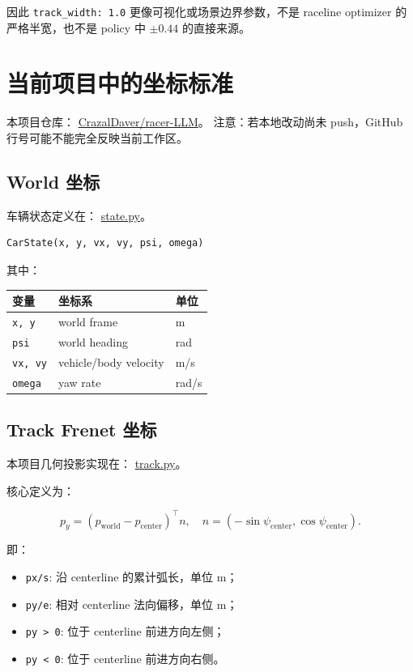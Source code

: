 \documentclass[UTF8]{ctexart}
\begin{document}
因此 \texttt{track\_width: 1.0} 更像可视化或场景边界参数，不是 raceline optimizer 的严格半宽，也不是 policy 中 \texttt{\(\pm 0.44\)} 的直接来源。

\section{当前项目中的坐标标准}

本项目仓库：
\href{https://github.com/CrazalDaver/racer-LLM}{CrazalDaver/racer-LLM}。
注意：若本地改动尚未 push，GitHub 行号可能不能完全反映当前工作区。

\subsection{World 坐标}

车辆状态定义在：
\href{https://github.com/CrazalDaver/racer-LLM/blob/main/state.py}{state.py}。

\begin{lstlisting}[language=Python]
CarState(x, y, vx, vy, psi, omega)
\end{lstlisting}

其中：

\begin{center}
\begin{tabular}{lll}
\toprule
变量 & 坐标系 & 单位 \\
\midrule
\texttt{x, y} & world frame & m \\
\texttt{psi} & world heading & rad \\
\texttt{vx, vy} & vehicle/body velocity & m/s \\
\texttt{omega} & yaw rate & rad/s \\
\bottomrule
\end{tabular}
\end{center}

\subsection{Track Frenet 坐标}

本项目几何投影实现在：
\href{https://github.com/CrazalDaver/racer-LLM/blob/main/track.py}{track.py}。

核心定义为：

\[
p_y = (p_{\mathrm{world}} - p_{\mathrm{center}})^\top n,
\quad
n = (-\sin\psi_{\mathrm{center}}, \cos\psi_{\mathrm{center}}).
\]

即：

\begin{itemize}
  \item \texttt{px/s}: 沿 centerline 的累计弧长，单位 m；
  \item \texttt{py/e}: 相对 centerline 法向偏移，单位 m；
  \item \texttt{py > 0}: 位于 centerline 前进方向左侧；
  \item \texttt{py < 0}: 位于 centerline 前进方向右侧。
\end{itemize}
\end{document}
